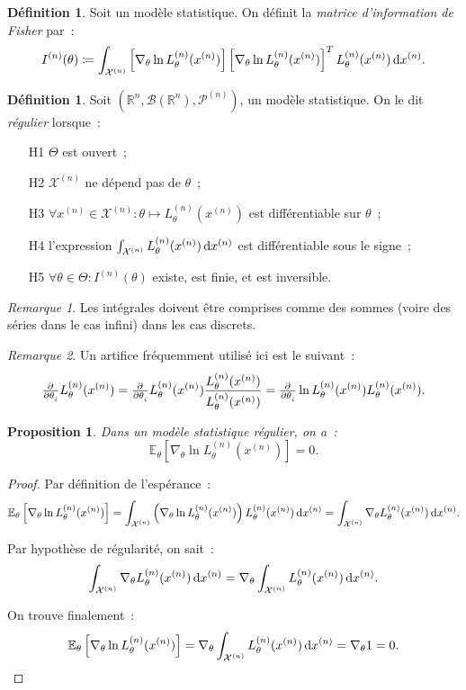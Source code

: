 \documentclass{report}
\newcommand{\E}{\mathbb E}
\newcommand{\statmod}[4]{\left(#1^{#4}, #2\left(#1^{#4}\right), #3^{\left(#4\right)}\right)}
\newcommand{\R}{\mathbb R}
\newcommand{\Brl}{\mathcal B}  %
\newtheorem{prp}[thm]{Proposition}
\theoremstyle{definition}
\newtheorem{déf}[thm]{Définition}
\theoremstyle{remark}
\newtheorem*{rmq}{Remarque}
\begin{document}
			\begin{déf} Soit un modèle statistique. On définit la \textit{matrice d'information de Fisher} par~:
			\[I^{(n)}(\theta) \coloneqq
				\int_{\mathcal X^{(n)}}\left[\nabla_\theta\ln L_\theta^{(n)}(x^{(n)})\right]\left[\nabla_\theta\ln L_\theta^{(n)}(x^{(n)})\right]^TL_\theta^{(n)}(x^{(n)})\dif x^{(n)}.\]
			\end{déf}

			\begin{déf} Soit $\statmod \R\Brl{\mathcal P}n$, un modèle statistique. On le dit \textit{régulier} lorsque~:
			\begin{itemize}
				\item[H1] $\Theta$ est ouvert~;
				\item[H2] $\mathcal X^{(n)}$ ne dépend pas de $\theta$~;
				\item[H3] $\forall x^{(n)} \in \mathcal X^{(n)} : \theta \mapsto L_\theta^{(n)}(x^{(n)})$ est différentiable sur $\theta$~;
				\item[H4] l'expression $\int_{\mathcal X^{(n)}}L_\theta^{(n)}(x^{(n)})\dif x^{(n)}$ est différentiable sous le signe~;
				\item[H5] $\forall \theta \in \Theta : I^{(n)}(\theta)$ existe, est finie, et est inversible.
			\end{itemize}
			\end{déf}

			\begin{rmq} Les intégrales doivent être comprises comme des sommes (voire des séries dans le cas infini) dans les cas discrets.
			\end{rmq}

			\begin{rmq} Un artifice fréquemment utilisé ici est le suivant~:
			\[\pd {}{\theta_i}L_\theta^{(n)}(x^{(n)}) = \pd {}{\theta_i}L_\theta^{(n)}(x^{(n)})\frac {L_\theta^{(n)}(x^{(n)})}{L_\theta^{(n)}(x^{(n)})}
				= \pd {}{\theta_i}\ln L_\theta^{(n)}(x^{(n)})L_\theta^{(n)}(x^{(n)}).\]
			\end{rmq}

			\begin{prp} Dans un modèle statistique régulier, on a~:
			\[\E_\theta\left[\nabla_\theta\ln L_\theta^{(n)}(x^{(n)})\right] = 0.\]
			\end{prp}

			\begin{proof} Par définition de l'espérance~:
			\[\E_\theta\left[\nabla_\theta\ln L_\theta^{(n)}(x^{(n)})\right]
				= \int_{\mathcal X^{(n)}}\left(\nabla_\theta\ln L_\theta^{(n)}(x^{(n)})\right)L_\theta^{(n)}(x^{(n)})\dif x^{(n)}
				= \int_{\mathcal X^{(n)}}\nabla_\theta L_\theta^{(n)}(x^{(n)})\dif x^{(n)}.\]

			Par hypothèse de régularité, on sait~:
			\[\int_{\mathcal X^{(n)}}\nabla_\theta L_\theta^{(n)}(x^{(n)})\dif x^{(n)} = \nabla_\theta\int_{\mathcal X^{(n)}}L_\theta^{(n)}(x^{(n)})\dif x^{(n)}.\]

			On trouve finalement~:
			\[\E_\theta\left[\nabla_\theta\ln L_\theta^{(n)}(x^{(n)})\right] = \nabla_\theta\int_{\mathcal X^{(n)}}L_\theta^{(n)}(x^{(n)})\dif x^{(n)}
				= \nabla_\theta 1 = 0.\]
			\end{proof}
\end{document}
